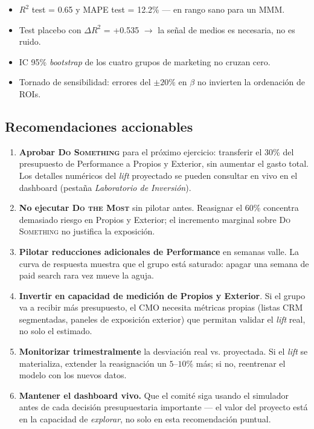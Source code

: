 \begin{itemize}[leftmargin=*, itemsep=1pt]
    \item $R^2$ test = 0.65 y MAPE test = 12.2\% — en rango sano para un MMM.
    \item Test placebo con $\Delta R^2$ = +0.535 $\rightarrow$ la señal de medios es necesaria, no es ruido.
    \item IC 95\% \textit{bootstrap} de los cuatro grupos de marketing no cruzan cero.
    \item Tornado de sensibilidad: errores del $\pm 20\%$ en $\beta$ no invierten la ordenación de ROIs.
\end{itemize}

\subsection{Recomendaciones accionables}

\begin{enumerate}[leftmargin=*, itemsep=4pt]
    \item \textbf{Aprobar \textsc{Do Something}} para el próximo ejercicio: transferir el 30\% del presupuesto de Performance a Propios y Exterior, sin aumentar el gasto total. Los detalles numéricos del \textit{lift} proyectado se pueden consultar en vivo en el dashboard (pestaña \textit{Laboratorio de Inversión}).
    \item \textbf{No ejecutar \textsc{Do the Most}} sin pilotar antes. Reasignar el 60\% concentra demasiado riesgo en Propios y Exterior; el incremento marginal sobre \textsc{Do Something} no justifica la exposición.
    \item \textbf{Pilotar reducciones adicionales de Performance} en semanas valle. La curva de respuesta muestra que el grupo está saturado: apagar una semana de paid search rara vez mueve la aguja.
    \item \textbf{Invertir en capacidad de medición de Propios y Exterior}. Si el grupo va a recibir más presupuesto, el CMO necesita métricas propias (listas CRM segmentadas, paneles de exposición exterior) que permitan validar el \textit{lift} real, no solo el estimado.
    \item \textbf{Monitorizar trimestralmente} la desviación real vs. proyectada. Si el \textit{lift} se materializa, extender la reasignación un $5$--$10\%$ más; si no, reentrenar el modelo con los nuevos datos.
    \item \textbf{Mantener el dashboard vivo.} Que el comité siga usando el simulador antes de cada decisión presupuestaria importante --- el valor del proyecto está en la capacidad de \textit{explorar}, no solo en esta recomendación puntual.
\end{enumerate}


